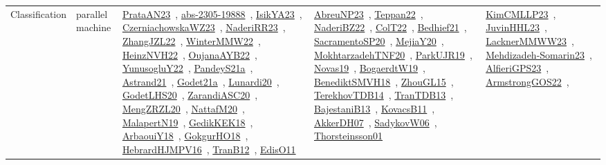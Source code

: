 {\begin{longtable}{lp{3cm}>{\raggedright\arraybackslash}p{6cm}>{\raggedright\arraybackslash}p{6cm}>{\raggedright\arraybackslash}p{8cm}}
Classification & parallel machine & \href{works/PrataAN23.pdf}{PrataAN23}~\cite{PrataAN23}, \href{works/abs-2305-19888.pdf}{abs-2305-19888}~\cite{abs-2305-19888}, \href{works/IsikYA23.pdf}{IsikYA23}~\cite{IsikYA23}, \href{works/CzerniachowskaWZ23.pdf}{CzerniachowskaWZ23}~\cite{CzerniachowskaWZ23}, \href{works/NaderiRR23.pdf}{NaderiRR23}~\cite{NaderiRR23}, \href{works/ZhangJZL22.pdf}{ZhangJZL22}~\cite{ZhangJZL22}, \href{works/WinterMMW22.pdf}{WinterMMW22}~\cite{WinterMMW22}, \href{works/HeinzNVH22.pdf}{HeinzNVH22}~\cite{HeinzNVH22}, \href{works/OujanaAYB22.pdf}{OujanaAYB22}~\cite{OujanaAYB22}, \href{works/YunusogluY22.pdf}{YunusogluY22}~\cite{YunusogluY22}, \href{works/PandeyS21a.pdf}{PandeyS21a}~\cite{PandeyS21a}, \href{works/Astrand21.pdf}{Astrand21}~\cite{Astrand21}, \href{works/Godet21a.pdf}{Godet21a}~\cite{Godet21a}, \href{works/Lunardi20.pdf}{Lunardi20}~\cite{Lunardi20}, \href{works/GodetLHS20.pdf}{GodetLHS20}~\cite{GodetLHS20}, \href{works/ZarandiASC20.pdf}{ZarandiASC20}~\cite{ZarandiASC20}, \href{works/MengZRZL20.pdf}{MengZRZL20}~\cite{MengZRZL20}, \href{works/NattafM20.pdf}{NattafM20}~\cite{NattafM20}, \href{works/MalapertN19.pdf}{MalapertN19}~\cite{MalapertN19}, \href{works/GedikKEK18.pdf}{GedikKEK18}~\cite{GedikKEK18}, \href{works/ArbaouiY18.pdf}{ArbaouiY18}~\cite{ArbaouiY18}, \href{works/GokgurHO18.pdf}{GokgurHO18}~\cite{GokgurHO18}, \href{works/HebrardHJMPV16.pdf}{HebrardHJMPV16}~\cite{HebrardHJMPV16}, \href{works/TranB12.pdf}{TranB12}~\cite{TranB12}, \href{works/EdisO11.pdf}{EdisO11}~\cite{EdisO11} & \href{works/AbreuNP23.pdf}{AbreuNP23}~\cite{AbreuNP23}, \href{works/Teppan22.pdf}{Teppan22}~\cite{Teppan22}, \href{works/NaderiBZ22.pdf}{NaderiBZ22}~\cite{NaderiBZ22}, \href{works/ColT22.pdf}{ColT22}~\cite{ColT22}, \href{works/Bedhief21.pdf}{Bedhief21}~\cite{Bedhief21}, \href{works/SacramentoSP20.pdf}{SacramentoSP20}~\cite{SacramentoSP20}, \href{works/MejiaY20.pdf}{MejiaY20}~\cite{MejiaY20}, \href{works/MokhtarzadehTNF20.pdf}{MokhtarzadehTNF20}~\cite{MokhtarzadehTNF20}, \href{works/ParkUJR19.pdf}{ParkUJR19}~\cite{ParkUJR19}, \href{works/Novas19.pdf}{Novas19}~\cite{Novas19}, \href{works/BogaerdtW19.pdf}{BogaerdtW19}~\cite{BogaerdtW19}, \href{works/BenediktSMVH18.pdf}{BenediktSMVH18}~\cite{BenediktSMVH18}, \href{works/ZhouGL15.pdf}{ZhouGL15}~\cite{ZhouGL15}, \href{works/TerekhovTDB14.pdf}{TerekhovTDB14}~\cite{TerekhovTDB14}, \href{works/TranTDB13.pdf}{TranTDB13}~\cite{TranTDB13}, \href{works/BajestaniB13.pdf}{BajestaniB13}~\cite{BajestaniB13}, \href{works/KovacsB11.pdf}{KovacsB11}~\cite{KovacsB11}, \href{works/AkkerDH07.pdf}{AkkerDH07}~\cite{AkkerDH07}, \href{works/SadykovW06.pdf}{SadykovW06}~\cite{SadykovW06}, \href{works/Thorsteinsson01.pdf}{Thorsteinsson01}~\cite{Thorsteinsson01} & \href{works/KimCMLLP23.pdf}{KimCMLLP23}~\cite{KimCMLLP23}, \href{works/JuvinHHL23.pdf}{JuvinHHL23}~\cite{JuvinHHL23}, \href{works/LacknerMMWW23.pdf}{LacknerMMWW23}~\cite{LacknerMMWW23}, \href{works/Mehdizadeh-Somarin23.pdf}{Mehdizadeh-Somarin23}~\cite{Mehdizadeh-Somarin23}, \href{works/AlfieriGPS23.pdf}{AlfieriGPS23}~\cite{AlfieriGPS23}, \href{works/ArmstrongGOS22.pdf}{ArmstrongGOS22}~\cite{ArmstrongGOS22}, 
\end{longtable}}
